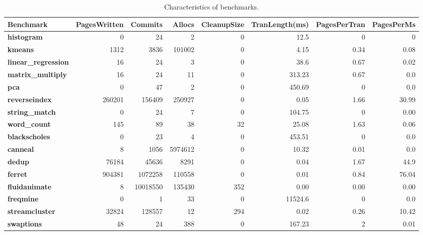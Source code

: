 \begin{table}
\centering
\begin{tabular}{|l|rrrr|rr|r|}
\hline
{\bf \small Benchmark} & {\bf \small PagesWritten} & {\bf \small Commits} & {\bf Allocs} & {\bf \small CleanupSize} & {\bf \small TranLength(ms)} & {\bf \small PagesPerTran} & {\bf \small PagesPerMs}\\
\hline
\small \textbf{histogram} & 0 & 24 & 2 & 0 & 12.5 & 0 & 0\\
\small \textbf{kmeans} & 1312 & 3836 & 101002 & 0 & 4.15 & 0.34 & 0.08\\
\small \textbf{linear\_regression} & 16 & 24 & 3 & 0 & 38.6 & 0.67 & 0.02\\
\small \textbf{matrix\_multiply} & 16 & 24 & 11 & 0 & 313.23 & 0.67 & 0.0\\
\small \textbf{pca} & 0 & 47 & 2 & 0 & 450.69 & 0 & 0.0\\
\small \textbf{reverseindex} & 260201 & 156409 & 250927 & 0 & 0.05 & 1.66 & 30.99 \\
\small \textbf{string\_match} & 0 & 24 & 7 & 0 & 104.75 & 0 & 0.00\\
\small \textbf{word\_count} & 145 & 89 & 38 & 32 & 25.08 & 1.63 & 0.06\\
\hline
\small \textbf{blackscholes} & 0 & 23 & 4 & 0 & 453.51 & 0 & 0.0\\
\small \textbf{canneal} & 8 & 1056 & 5974612 & 0 & 10.32 & 0.01 & 0.0\\
\small \textbf{dedup} & 76184 & 45636 & 8291 & 0 & 0.04 & 1.67 & 44.9\\
\small \textbf{ferret} & 904381 & 1072258 & 110558 & 0 & 0.01 & 0.84 & 76.04\\
\small \textbf{fluidanimate} & 8 & 10018550 & 135430 & 352 & 0.00 & 0.00 & 0.00\\
\small \textbf{freqmine} & 0 & 1 & 33 & 0 & 11524.6 & 0 & 0.0 \\
\small \textbf{streamcluster} & 32824 & 128557 & 12 & 294 & 0.02 & 0.26 & 10.42\\
\small \textbf{swaptions} & 48 & 24 & 388 & 0 & 167.23 & 2 & 0.01\\
\hline
\end{tabular}
\caption{Characteristics of benchmarks. 
\label{table:characteristics}}
\end{table}


